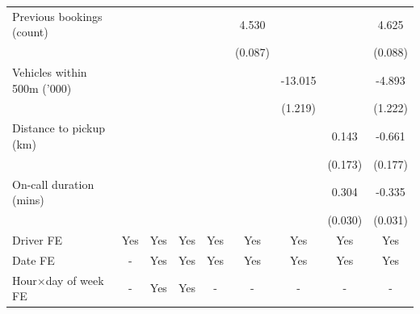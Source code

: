 \documentclass[reviewmode]{AEA}
\begin{document}
\begin{landscape}
\begin{table}
{\begin{tabular}{l*{8}{S}}
					\addlinespace
					Previous bookings (count)&                     &                     &                     &                     &       4.530&                     &                     &       4.625\\
					&                     &                     &                     &                     &     (0.087)         &                     &                     &     (0.088)         \\
					\addlinespace
					Vehicles within 500m ('000)&                     &                     &                     &                     &                     &     -13.015&                     &      -4.893\\
					&                     &                     &                     &                     &                     &     (1.219)         &                     &     (1.222)         \\
					\addlinespace
					Distance to pickup (km)&                     &                     &                     &                     &                     &                     &       0.143         &      -0.661\\
					&                     &                     &                     &                     &                     &                     &     (0.173)         &     (0.177)         \\
					\addlinespace
					On-call duration (mins)&                     &                     &                     &                     &                     &                     &       0.304&      -0.335\\
					&                     &                     &                     &                     &                     &                     &     (0.030)         &     (0.031)         \\
					\addlinespace
					Driver FE           &       {Yes}         &       {Yes}         &       {Yes}         &       {Yes}         &       {Yes}         &       {Yes}         &       {Yes}         &       {Yes}         \\
					\addlinespace
					Date FE           &       {-}         &       {Yes}         &       {Yes}         &       {Yes}         &       {Yes}         &       {Yes}         &       {Yes}         &       {Yes}         \\
					\addlinespace
					Hour\(\times\)day of week FE&         {-}         &       {Yes}         &       {Yes}         &         {-}         &         {-}         &         {-}         &         {-}         &         {-}         \\

\end{tabular}}
\end{table}
\end{landscape}
\end{document}
